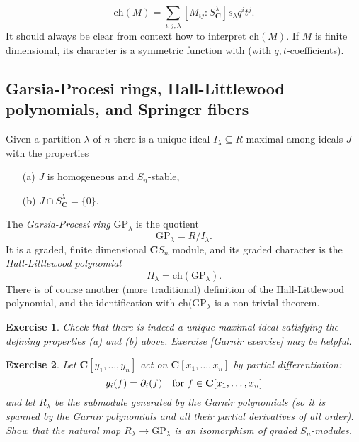 \documentclass[12pt, reqno]{amsart}
\numberwithin{equation}{section}
\theoremstyle{definition}
\theoremstyle{plain}
\newtheorem{exercise}{Exercise}
\newcommand{\CC}{\mathbf{C}}
\begin{document}
$$\mathrm{ch}(M)=\sum_{i,j,\lambda} [M_{ij}:S^\lambda_\CC] s_\lambda q^i t^j.$$ It should always be clear from context how to interpret $\mathrm{ch}(M)$. If $M$ is finite dimensional, its character is a symmetric function with (with $q,t$-coefficients).

\subsection{Garsia-Procesi rings, Hall-Littlewood polynomials, and Springer fibers} Given a partition $\lambda$ of $n$ there is a unique ideal $I_\lambda \subseteq R$ maximal among ideals $J$ with the properties
\begin{enumerate}
\item[(a)] $J$ is homogeneous and $S_n$-stable,
\item[(b)] $J \cap S^\lambda_\CC=\{ 0 \}$.
\end{enumerate} The \emph{Garsia-Procesi ring} $\mathrm{GP}_\lambda$ is the quotient
$$\mathrm{GP}_\lambda=R / I_\lambda.$$ It is a graded, finite dimensional $\CC S_n$ module, and its graded character is the \emph{Hall-Littlewood polynomial} 
$$H_\lambda=\mathrm{ch}(\mathrm{GP}_\lambda).$$ There is of course another (more traditional) definition of the Hall-Littlewood polynomial, and the identification with $\mathrm{ch}(\mathrm{GP}_\lambda$ is a non-trivial theorem.

\begin{exercise}
Check that there is indeed a unique maximal ideal satisfying the defining properties (a) and (b) above. Exercise \ref{Garnir exercise} may be helpful.
\end{exercise}

\begin{exercise}
Let $\CC[y_1,\dots,y_n]$ act on $\CC[x_1,\dots,x_n]$ by partial differentiation:
$$y_i(f)=\partial_i(f) \quad \hbox{for $f \in \CC[x_1,\dots,x_n]$}$$ and let $R_\lambda$ be the submodule generated by the Garnir polynomials (so it is spanned by the Garnir polynomials and all their partial derivatives of all order). Show that the natural map $R_\lambda \rightarrow \mathrm{GP}_\lambda$ is an isomorphism of graded $S_n$-modules. 
\end{exercise}	
\end{document}
